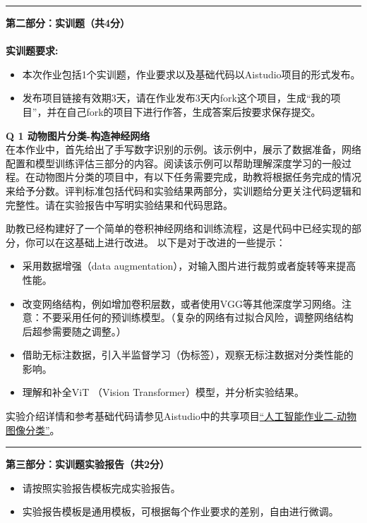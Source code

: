 \documentclass[a4paper, 11pt]{article}
\newenvironment{problem}[2][Q]
    { \begin{mdframed}[backgroundcolor=gray!20] \textbf{#1 #2} \\}
    {  \end{mdframed}}
\begin{document}
\begin{CJK}{UTF8}{gbsn}
\newpage
\noindent\rule{7in}{1pt}
\textbf{第二部分：实训题（共4分）}
\\ \\
\textbf{实训题要求:}
\begin{itemize}
    \item 本次作业包括1个实训题，作业要求以及基础代码以Aistudio项目的形式发布。
    \item 发布项目链接有效期3天，请在作业发布3天内fork这个项目，生成``我的项目''，并在自己fork的项目下进行作答，生成答案后按要求保存提交。
\end{itemize}


\begin{problem}{1 动物图片分类-构造神经网络}

在本作业中，首先给出了手写数字识别的示例。该示例中，展示了数据准备，网络配置和模型训练评估三部分的内容。阅读该示例可以帮助理解深度学习的一般过程。在动物图片分类的项目中，有以下任务需要完成，助教将根据任务完成的情况来给予分数。评判标准包括代码和实验结果两部分，实训题给分更关注代码逻辑和完整性。请在实验报告中写明实验结果和代码思路。

助教已经构建好了一个简单的卷积神经网络和训练流程，这是代码中已经实现的部分，你可以在这基础上进行改进。
以下是对于改进的一些提示：

\begin{itemize}
    \item 采用数据增强（data augmentation），对输入图片进行裁剪或者旋转等来提高性能。
    \item 改变网络结构，例如增加卷积层数，或者使用VGG等其他深度学习网络。注意：不要采用任何的预训练模型。（复杂的网络有过拟合风险，调整网络结构后超参需要随之调整。）
    \item 借助无标注数据，引入半监督学习（伪标签），观察无标注数据对分类性能的影响。
    \item 理解和补全ViT （Vision Transformer）模型，并分析实验结果。
\end{itemize}


实验介绍详情和参考基础代码请参见Aistudio中的共享项目\href{https://aistudio.baidu.com/studio/project/partial/verify/8989445/bf858e9af4984c35ba8157858e3dce89}{“人工智能作业二-动物图像分类”}。

\end{problem}

\noindent\rule{7in}{1pt}
\textbf{第三部分：实训题实验报告（共2分）}
\begin{itemize}
    \item 请按照实验报告模板完成实验报告。
    \item 实验报告模板是通用模板，可根据每个作业要求的差别，自由进行微调。
\end{itemize}

\end{CJK}
\end{document}
